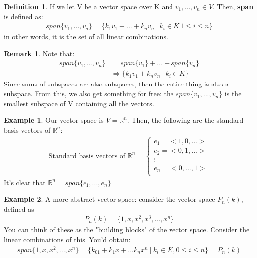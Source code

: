 \documentclass[a4paper, 12pt]{article}
\theoremstyle{definition}
\newtheorem{exmp}{Example}[section]
\theoremstyle{definition}
\newtheorem{defn}{Definition}[section]
\theoremstyle{definition}
\theoremstyle{definition}
\newtheorem{rmk}{Remark}[section]
\begin{document}
{\begin{defn}
	If we let V be a vector space over K and $v_1, ..., v_n \in V$. Then, \textbf{span} is defined as: 
	\begin{align}
		span\{ v_1, ..., v_n \} = \{k_1v_1 + ... + k_n v_n\ |\ k_i \in K\, 1 \leq i \leq n \} 
	\end{align}
	in other words, it is the set of all linear combinations. 
\end{defn}
\begin{rmk}
	Note that: 
	\begin{align*}
		span\{ v_1, ..., v_n \} & = span \{ v_1 \} + ... + span \{v_n \} \\ 
		& \Rightarrow \{ k_1 v_1 + k_n v_n\ |\ k_i \in K \}  
	\end{align*}
	Since sums of subspaces are also subspaces, then the entire thing is also a subspace. From this, we also get something for free: the $span \{ v_1, ..., v_n \}$ is the smallest subspace of V containing all the vectors. 
\end{rmk}
\begin{exmp}
	Our vector space is $V = \mathbb{R}^n$. Then, the following are the standard basis vectors of $\mathbb{R}^n$: 
	\begin{align*}
	\mbox{Standard basis vectors of $\mathbb{R}^n$} =
	\begin{cases} 
		e_1 = <1,0,...> \\
		e_2 = <0,1,...> \\
		\vdots \\ 
		e_n = <0,...,1> \\ 
		\end{cases} 
	\end{align*}
It's clear that $\mathbb{R}^n = span\{ e_1, ..., e_n \}$
\end{exmp} 
\begin{exmp}
	A more abstract vector space: consider the vector space $P_n(k)$, defined as 
	\begin{align*}
		P_n(k) = \{1, x, x^2, x^3,...,x^n \} 
	\end{align*}
	You can think of these as the "building blocks" of the vector space. Consider the linear combinations of this. You'd obtain: 
	\begin{align*}
		span\{1,x,x^2, ...,x^n \} = \{ k_01 + k_1x + ... k_nx^n\ |\ k_i \in K, 0 \leq i \leq n \} = P_n(k) 
	\end{align*}
\end{exmp} 

}
\end{document}
